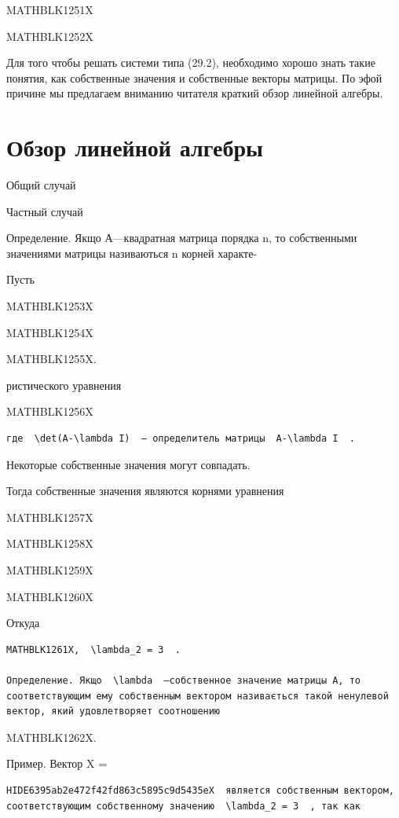 \documentclass[
  ukrainian,
]{article}
\begin{document}
MATHBLK1251X

MATHBLK1252X

Для того чтобы решать системи типа (29.2), необходимо хорошо знать такие
понятия, как собственные значения и собственные векторы матрицы. По эфой
причине мы предлагаем вниманию читателя краткий обзор линейной алгебры.

\section{Обзор линейной
алгебры}\label{ux43eux431ux437ux43eux440-ux43bux438ux43dux435ux439ux43dux43eux439-ux430ux43bux433ux435ux431ux440ux44b}

Общий случай

Частный случай

Определение. Якщо А---квадратная матрица порядка n, то собственными
значениями матрицы називаються n корней характе-

Пусть

MATHBLK1253X

MATHBLK1254X

MATHBLK1255X.

ристического уравнения

MATHBLK1256X

\begin{verbatim}
где  \det(A-\lambda I)  — определитель матрицы  A-\lambda I  .
\end{verbatim}

Некоторые собственные значения могут совпадать.

Тогда собственные значения являются корнями уравнения

MATHBLK1257X

MATHBLK1258X

MATHBLK1259X

MATHBLK1260X

Откуда

\begin{verbatim}
MATHBLK1261X,  \lambda_2 = 3  .

Определение. Якщо  \lambda  —собственное значение матрицы A, то соответствующим ему собственным вектором називається такой ненулевой вектор, який удовлетворяет соотношению
\end{verbatim}

MATHBLK1262X.

Пример. Вектор X =

\begin{verbatim}
HIDE6395ab2e472f42fd863c5895c9d5435eX  является собственным вектором, соответствующим собственному значению  \lambda_2 = 3  , так как
\end{verbatim}
\end{document}
